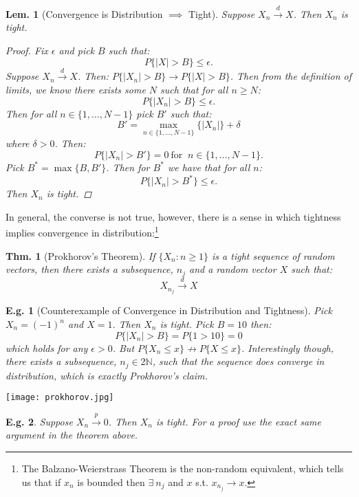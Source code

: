 \documentclass{tufte-book}
\theoremstyle{mytheoremstyle}
\newtheorem*{thm}{Thm.}
\theoremstyle{mylemstyle}
\newtheorem*{lem}{Lem.}
\theoremstyle{mydefstyle}
\newtheorem*{ex}{E.g.}
\begin{document}
\begin{lem}[Convergence is Distribution \(\implies\) Tight] Suppose \(X_n \overset{d}{\rightarrow} X\). Then \(X_n\) is tight.
	\begin{proof}
		Fix \(\epsilon\) and pick \(B\) such that: 
			\[P\{|X| > B\} \le \epsilon \text{.}\] 
		Suppose \(X_n \overset{d}{\rightarrow} X\). Then: \(P\{|X_n| > B\} \rightarrow P\{|X| > B\}\). Then from the definition of limits, we know there exists some \(N\) such that for all \(n \ge N\):
			\[P\{|X_n| > B\} \le \epsilon \text{.}\]
		Then for all \(n \in \{1, \dots, N-1\}\) pick \(B'\) such that:
			\[B' = \max_{n \in \{1, \dots, N-1\}}\{|X_n|\} + \delta\]
		where \(\delta > 0\). Then:
			\[P\{|X_n| > B'\} = 0\ \text{for }\ n \in \{1, \dots, N-1\}\text{.} \]
		Pick \(B^* = \max\{B, B'\}\). Then for \(B^*\) we have that for all \(n\):
			\[P\{|X_n| > B^*\} \le \epsilon \text{.}\]	
		Then \(X_n\) is tight.
	\end{proof}
\end{lem}
In general, the converse is not true, however, there is a sense in which tightness implies convergence in distribution:\footnote{The Balzano-Weierstrass Theorem is the non-random equivalent, which tells us that if \(x_n\) is bounded then \(\exists\ n_j\) and \(x\) s.t. \(x_{n_j} \rightarrow x\).}
\begin{thm}[Prokhorov's Theorem] If \(\{X_n: n \ge 1\}\) is a tight sequence of random vectors, then there exists a subsequence, \(n_j\) and a random vector \(X\) such that:
	\[X_{n_j} \overset{d}{\rightarrow} X\]
\end{thm}
\begin{ex}[Counterexample of Convergence in Distribution and Tightness] Pick \(X_n = (-1)^n\) and \(X = 1\). Then \(X_n\) is tight. Pick \(B = 10\) then:
	\[P\{|X_n| > B\} = P\{1 > 10\} = 0\]
which holds for any \(\epsilon > 0\). But \(P\{X_n \le x\} \not \rightarrow P\{X \le x\}\). Interestingly though, there exists a subsequence, \(n_j \in 2\mathbb{N}\), such that the sequence does converge in distribution, which is exactly Prokhorov's claim. 
\end{ex}
\begin{marginfigure}
	\texttt{[image: prokhorov.jpg]}
	\caption{Yuri Vasilyevich Prokhorov. Known associate of Andrey Nikolaevich Kolmogorov.}
\end{marginfigure}
\begin{ex} Suppose \(X_n \overset{p}{\rightarrow} 0\). Then \(X_n\) is tight. For a proof use the exact same argument in the theorem above.
\end{ex}
\end{document}
